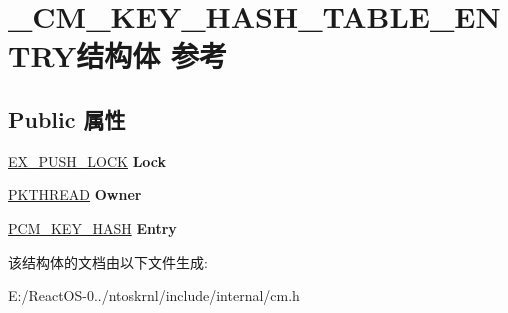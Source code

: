 \hypertarget{struct___c_m___k_e_y___h_a_s_h___t_a_b_l_e___e_n_t_r_y}{}\section{\+\_\+\+C\+M\+\_\+\+K\+E\+Y\+\_\+\+H\+A\+S\+H\+\_\+\+T\+A\+B\+L\+E\+\_\+\+E\+N\+T\+R\+Y结构体 参考}
\label{struct___c_m___k_e_y___h_a_s_h___t_a_b_l_e___e_n_t_r_y}
\subsection*{Public 属性}
\begin{DoxyCompactItemize}
\item 
\mbox{\label{struct___c_m___k_e_y___h_a_s_h___t_a_b_l_e___e_n_t_r_y_a4972bafbc97725e2aa1cfec0d5b31367}} 
\hyperlink{struct___e_x___p_u_s_h___l_o_c_k}{E\+X\+\_\+\+P\+U\+S\+H\+\_\+\+L\+O\+CK} {\bfseries Lock}
\item 
\mbox{\label{struct___c_m___k_e_y___h_a_s_h___t_a_b_l_e___e_n_t_r_y_ab2588c5700d33aa5d80fc1a770131e33}} 
\hyperlink{struct___k_t_h_r_e_a_d}{P\+K\+T\+H\+R\+E\+AD} {\bfseries Owner}
\item 
\mbox{\label{struct___c_m___k_e_y___h_a_s_h___t_a_b_l_e___e_n_t_r_y_a3b0ea1c3f8d3f0d9f84c061616d91c82}} 
\hyperlink{struct___c_m___k_e_y___h_a_s_h}{P\+C\+M\+\_\+\+K\+E\+Y\+\_\+\+H\+A\+SH} {\bfseries Entry}
\end{DoxyCompactItemize}


该结构体的文档由以下文件生成\+:\begin{DoxyCompactItemize}
\item 
E\+:/\+React\+O\+S-\/0../ntoskrnl/include/internal/cm.\+h\end{DoxyCompactItemize}
